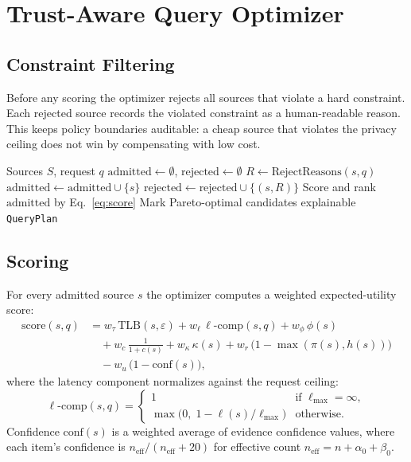 \documentclass[runningheads]{llncs}
\begin{document}
\section{Trust-Aware Query Optimizer}
\label{sec:optimizer}

\subsection{Constraint Filtering}

Before any scoring the optimizer rejects all sources that violate a hard
constraint.  Each rejected source records the violated constraint as a
human-readable reason.  This keeps policy boundaries auditable: a cheap
source that violates the privacy ceiling does not win by compensating
with low cost.

\begin{algorithm}[t]
\caption{Trust-Aware Source Selection}
\label{alg:optimizer}
\begin{algorithmic}[1]
\REQUIRE Sources $S$, request $q$
\STATE $\text{admitted} \leftarrow \emptyset$,
       $\text{rejected} \leftarrow \emptyset$
  \STATE $R \leftarrow \text{RejectReasons}(s, q)$
    \STATE $\text{admitted} \leftarrow \text{admitted} \cup \{s\}$
  \ELSE
    \STATE $\text{rejected} \leftarrow \text{rejected} \cup \{(s, R)\}$
  \ENDIF
\ENDFOR
\STATE Score and rank $\text{admitted}$ by Eq.~\ref{eq:score}
\STATE Mark Pareto-optimal candidates
\RETURN explainable \texttt{QueryPlan}
\end{algorithmic}
\end{algorithm}

\subsection{Scoring}

For every admitted source $s$ the optimizer computes a weighted
expected-utility score:
\begin{align}
  \text{score}(s, q) &=
    w_\tau\,\text{TLB}(s,\varepsilon)
    + w_\ell\,\ell\text{-comp}(s,q)
    + w_\phi\,\phi(s) \nonumber\\
  &\quad
    + w_c\,\tfrac{1}{1+c(s)}
    + w_\kappa\,\kappa(s)
    + w_r\,\bigl(1-\max(\pi(s),h(s))\bigr) \nonumber\\
  &\quad
    - w_u\,\bigl(1-\text{conf}(s)\bigr),
  \label{eq:score}
\end{align}
where the latency component normalizes against the request ceiling:
\begin{equation}
  \ell\text{-comp}(s,q) =
    \begin{cases}
      1 & \text{if } \ell_{\max} = \infty, \\
      \max\!\bigl(0,\; 1 - \ell(s)/\ell_{\max}\bigr) & \text{otherwise.}
    \end{cases}
\end{equation}
Confidence $\text{conf}(s)$ is a weighted average of evidence confidence
values, where each item's confidence is
$n_{\text{eff}}/(n_{\text{eff}}+20)$ for effective count
$n_{\text{eff}} = n + \alpha_0 + \beta_0$.
\end{document}
